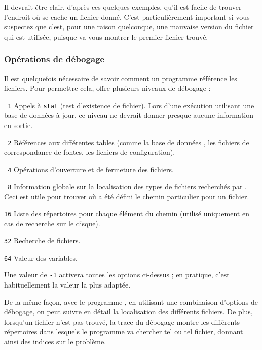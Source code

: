 \documentclass[german, english, french, 12pt]{article}
\begin{document}
Il devrait être clair, d'après ces quelques exemples, qu'il est facile de
trouver l'endroit où se cache un fichier donné. C'est particulièrement important
si vous suspectez que c'est, pour une raison quelconque, une mauvaise version du
fichier qui est utilisée, puisque  va vous montrer le premier
fichier trouvé.

\subsubsection{Opérations de débogage}
\label{sec:debugging}

Il est quelquefois nécessaire de savoir comment un programme référence les
fichiers. Pour permettre cela, \KPS{} offre plusieurs niveaux de débogage :
\begin{ttdescription}
\item[\texttt{\ 1}] Appels à \texttt{stat} (test d'existence de fichier). Lors
  d'une exécution utilisant une base de données  à jour, ce niveau ne
  devrait donner presque aucune information en sortie.
\item[\texttt{\ 2}] Références aux différentes tables (comme la base de données
  , les fichiers de correspondance de fontes, les fichiers de
  configuration).
\item[\texttt{\ 4}] Opérations d'ouverture et de fermeture des fichiers.
\item[\texttt{\ 8}] Information globale sur la localisation des types de
  fichiers recherchés par \KPS. Ceci est utile pour trouver où a été défini le
  chemin particulier pour un fichier.
\item[\texttt{16}] Liste des répertoires pour chaque élément du chemin (utilisé
  uniquement en cas de recherche sur le disque).
\item[\texttt{32}] Recherche de fichiers.
\item[\texttt{64}] Valeur des variables.
\end{ttdescription}
Une valeur de \texttt{-1} activera toutes les options ci-dessus ; en pratique,
c'est habituellement la valeur la plus adaptée.

De la même façon, avec le programme , en utilisant une
combinaison d'options de débogage, on peut suivre en détail la localisation des
différents fichiers. De plus, lorsqu'un fichier n'est pas trouvé, la trace du
débogage montre les différents répertoires dans lesquels le programme va
chercher tel ou tel fichier, donnant ainsi des indices sur le problème.
\end{document}
